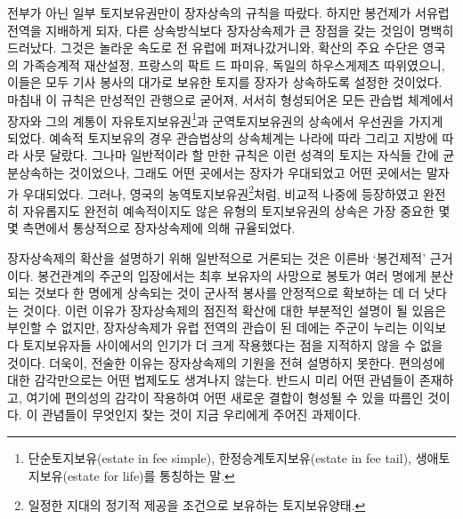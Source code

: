 전부가 아닌 일부 토지보유권만이 장자상속의 규칙을 따랐다.
하지만 봉건제가 서유럽 전역을 지배하게 되자,
다른 상속방식보다 장자상속제가 큰 장점을 갖는 것임이 명백히 드러났다.
그것은 놀라운 속도로 전 유럽에 퍼져나갔거니와,
확산의 주요 수단은 영국의 가족승계적 재산설정,
프랑스의 팍트 드 파미유,
독일의 하우스게제츠 따위였으니,
이들은 모두 기사 봉사의 대가로 보유한 토지를
장자가 상속하도록 설정한 것이었다.
마침내 이 규칙은 만성적인 관행으로 굳어져,
서서히 형성되어온 모든 관습법 체계에서
장자와 그의 계통이
자유토지보유권\footnote{%
  단순토지보유(estate in fee simple),
  한정승계토지보유(estate in fee tail),
  생애토지보유(estate for life)를 통칭하는 말.
}과
군역토지보유권의 상속에서 우선권을 가지게 되었다.
예속적 토지보유의 경우 
관습법상의 상속체계는 나라에 따라 그리고 지방에 따라 사뭇 달랐다.
그나마 일반적이라 할 만한 규칙은 이런 성격의 토지는 자식들 간에
균분상속하는 것이었으나, 그래도 어떤 곳에서는
장자가 우대되었고 어떤 곳에서는 말자가 우대되었다.
그러나,
영국의 농역토지보유권\footnote{%
  일정한 지대의 정기적 제공을 조건으로 보유하는 토지보유양태.
}처럼,
비교적 나중에 등장하였고 완전히 자유롭지도 완전히 예속적이지도 않은
유형의 토지보유권의 상속은 가장 중요한 몇몇 측면에서
통상적으로 장자상속제에 의해 규율되었다.

장자상속제의 확산을 설명하기 위해 일반적으로 거론되는 것은
이른바 `봉건제적' 근거이다.
봉건관계의 주군의 입장에서는
최후 보유자의 사망으로
봉토가
여러 명에게 분산되는 것보다
한 명에게 상속되는 것이 군사적 봉사를 안정적으로 확보하는 데
더 낫다는 것이다.
이런 이유가 장자상속제의 점진적 확산에 대한 부분적인 설명이 될 있음은
부인할 수 없지만,
장자상속제가 유럽 전역의 관습이 된 데에는
주군이 누리는 이익보다 토지보유자들 사이에서의 인기가 더 크게
작용했다는 점을
지적하지 않을 수 없을 것이다.
더욱이, 전술한 이유는 장자상속제의 기원을 전혀 설명하지 못한다.
편의성에 대한 감각만으로는 어떤 법제도도 생겨나지 않는다.
반드시 미리 어떤 관념들이 존재하고, 여기에 편의성의 감각이 작용하여
어떤 새로운 결합이 형성될 수 있을 따름인 것이다.
이 관념들이 무엇인지 찾는 것이 지금 우리에게 주어진 과제이다.

